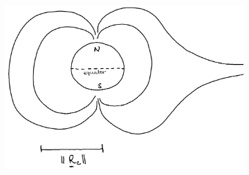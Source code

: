 \begin{enumerate}
\begin{figure}[t]
\begin{subfigure}[t]{.3\linewidth}
            \centering
            \includegraphics[width=.95\linewidth]{bilder/L7_curvB.png}
            \caption{}\label{fig:L7_curvB}
        \end{subfigure}


\end{figure}
\end{enumerate}

